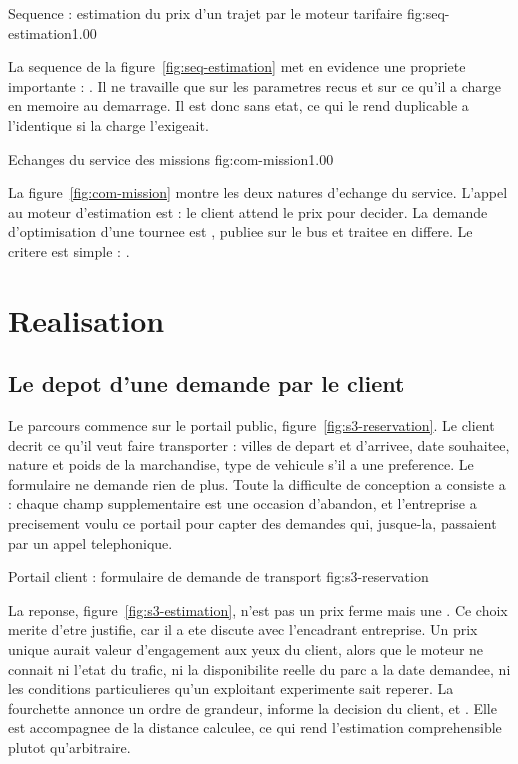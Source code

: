  {Sequence : estimation du prix d'un trajet par le moteur tarifaire}
  {fig:seq-estimation}{1.00}

La sequence de la figure~\ref{fig:seq-estimation} met en evidence une
propriete importante : . Il ne travaille que sur les parametres recus et sur ce qu'il a
charge en memoire au demarrage. Il est donc sans etat, ce qui le rend
duplicable a l'identique si la charge l'exigeait.

  {Echanges du service des missions}
  {fig:com-mission}{1.00}

La figure~\ref{fig:com-mission} montre les deux natures d'echange du
service. L'appel au moteur d'estimation est  : le
client attend le prix pour decider. La demande d'optimisation d'une
tournee est , publiee sur le bus et traitee en
differe. Le critere est simple : .

\section{Realisation}

\subsection{Le depot d'une demande par le client}

Le parcours commence sur le portail public, figure~\ref{fig:s3-reservation}.
Le client decrit ce qu'il veut faire transporter : villes de depart et
d'arrivee, date souhaitee, nature et poids de la marchandise, type de
vehicule s'il a une preference. Le formulaire ne demande rien de plus.
Toute la difficulte de conception a consiste a  : chaque champ supplementaire est
une occasion d'abandon, et l'entreprise a precisement voulu ce portail
pour capter des demandes qui, jusque-la, passaient par un appel
telephonique.

  {Portail client : formulaire de demande de transport}
  {fig:s3-reservation}

La reponse, figure~\ref{fig:s3-estimation}, n'est pas un prix ferme mais
une . Ce choix merite d'etre justifie, car il a ete
discute avec l'encadrant entreprise. Un prix unique aurait valeur
d'engagement aux yeux du client, alors que le moteur ne connait ni l'etat
du trafic, ni la disponibilite reelle du parc a la date demandee, ni les
conditions particulieres qu'un exploitant experimente sait reperer. La
fourchette annonce un ordre de grandeur, informe la decision du client, et
. Elle est
accompagnee de la distance calculee, ce qui rend l'estimation
comprehensible plutot qu'arbitraire.

